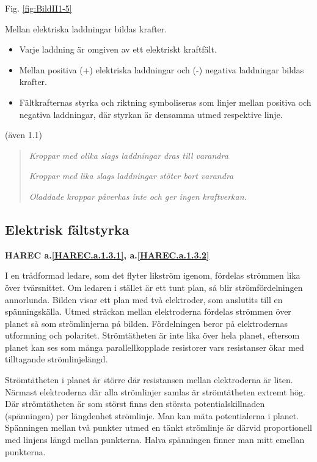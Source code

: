 Fig. \ref{fig:BildII1-5}

Mellan elektriska laddningar bildas krafter.

\begin{itemize}
\item Varje laddning är omgiven av ett elektriskt kraftfält.
\item Mellan positiva (+) elektriska laddningar
och (-) negativa laddningar bildas krafter.
\item Fältkrafternas styrka och riktning symboliseras som linjer mellan positiva och
negativa laddningar, där styrkan är densamma utmed respektive linje.
\end{itemize}

(även 1.1)

\begin{quote}
\emph{Kroppar med olika slags laddningar dras till varandra}

\emph{Kroppar med lika slags laddningar stöter bort varandra}

\emph{Oladdade kroppar påverkas inte och ger ingen kraftverkan.}
\end{quote}

\subsection{Elektrisk fältstyrka}
\textbf{HAREC a.\ref{HAREC.a.1.3.1}, a.\ref{HAREC.a.1.3.2}\label{myHAREC.a.1.3.1}\label{myHAREC.a.1.3.2}}

I en trådformad ledare, som det flyter likström igenom, fördelas strömmen lika
över tvärsnittet. Om ledaren i stället är ett tunt plan, så blir
strömfördelningen annorlunda. Bilden visar ett plan med två elektroder, som
anslutits till en spänningskälla. Utmed sträckan mellan elektroderna fördelas
strömmen över planet så som strömlinjerna på bilden. Fördelningen beror på
elektrodernas utformning och polaritet. Strömtätheten är inte lika över hela
planet, eftersom planet kan ses som många parallellkopplade resistorer vars
resistanser ökar med tilltagande strömlinjelängd.

Strömtätheten i planet är större där resistansen mellan elektroderna är liten.
Närmast elektroderna där alla strömlinjer samlas är strömtätheten extremt hög.
Där strömtätheten är som störst finns den största potentialskillnaden
(spänningen) per längdenhet strömlinje. Man kan mäta potentialerna i planet.
Spänningen mellan två punkter utmed en tänkt strömlinje är därvid proportionell
med linjens längd mellan punkterna. Halva spänningen finner man mitt emellan
punkterna.

